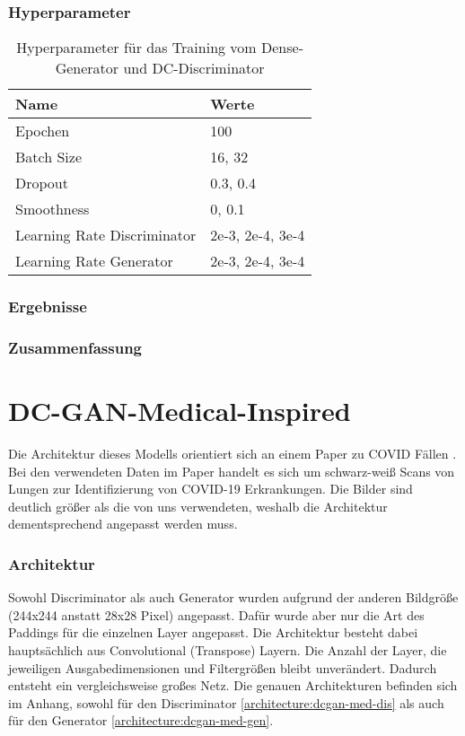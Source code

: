 \subsubsection{Hyperparameter}
\begin{table}[H]
	\centering
	\begin{tabular}{l l}
		Name                        & Werte            \\ \hline
		Epochen                     & 100              \\
		Batch Size                  & 16, 32           \\
		Dropout                     & 0.3, 0.4         \\
		Smoothness                  & 0, 0.1           \\
		Learning Rate Discriminator & 2e-3, 2e-4, 3e-4 \\
		Learning Rate Generator     & 2e-3, 2e-4, 3e-4
	\end{tabular}
	\caption{Hyperparameter für das Training vom Dense-Generator und DC-Discriminator}
\end{table}
\subsubsection{Ergebnisse}
\subsubsection{Zusammenfassung}

\section{DC-GAN-Medical-Inspired}

Die Architektur dieses Modells orientiert sich an einem Paper zu COVID Fällen \cite{inspiration-dc-gan-med}.
Bei den verwendeten Daten im Paper handelt es sich um schwarz-weiß Scans von Lungen zur Identifizierung von COVID-19 Erkrankungen.
Die Bilder sind deutlich größer als die von uns verwendeten, weshalb die Architektur dementsprechend angepasst werden muss.

\subsubsection{Architektur}
Sowohl Discriminator als auch Generator wurden aufgrund der anderen Bildgröße (244x244 anstatt 28x28 Pixel) angepasst.
Dafür wurde aber nur die Art des Paddings für die einzelnen Layer angepasst.
Die Architektur besteht dabei hauptsächlich aus Convolutional (Transpose) Layern.
Die Anzahl der Layer, die jeweiligen Ausgabedimensionen und Filtergrößen bleibt unverändert.
Dadurch entsteht ein vergleichsweise großes Netz.
Die genauen Architekturen befinden sich im Anhang, sowohl für den Discriminator \cref{architecture:dcgan-med-dis} als auch für den Generator \cref{architecture:dcgan-med-gen}.

